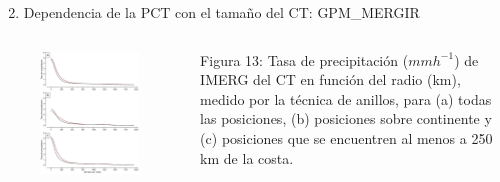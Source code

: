 \begin{frame}
\begin{enumerate}
\setcounter{enumi}{1}
    \item Dependencia de la PCT con el tamaño del CT: GPM\_MERGIR
\end{enumerate}
    \begin{columns}
        \begin{column}{0.6\textwidth}
        \begin{figure}
            \centering
            \includegraphics[scale = 0.22]{Images/Figures/Fig_3_16.jpeg}
            \caption{}
            \label{fig:fig_rbp}
        \end{figure}
        \end{column}
        
        \begin{column}{0.4\textwidth}
            \begin{block}{Figura 13:}
                Tasa de precipitación ($mm h^{-1}$) de IMERG del CT en función del radio (km), medido por la técnica de anillos, para (a) todas las posiciones, (b) posiciones sobre continente y (c) posiciones que se encuentren al menos a 250 km de la costa.
            \end{block}
        \end{column}
    \end{columns}
\end{frame}

